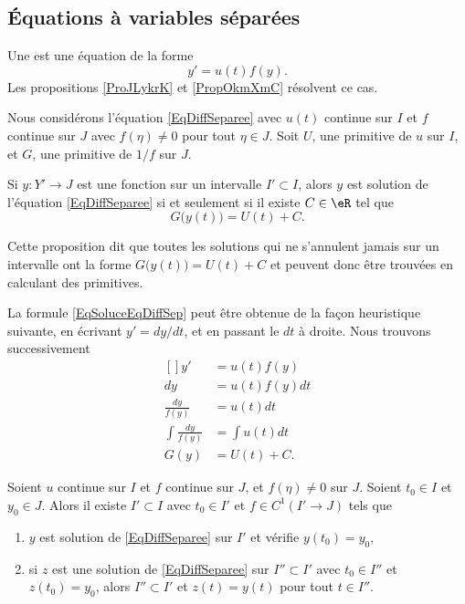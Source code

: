 					\subsection{Équations à variables séparées}

Une  est une équation  de la forme
\begin{equation}		\label{EqDiffSeparee}
	y'=u(t)f(y).
\end{equation}
Les propositions \ref{ProJLykrK} et \ref{PropOkmXmC} résolvent ce cas.
\begin{proposition}     \label{ProJLykrK}
Nous considérons l'équation \eqref{EqDiffSeparee} avec $u(t)$ continue sur $I$ et $f$ continue sur $J$ avec $f(\eta)\neq 0$ pour tout $\eta\in J$. Soit $U$, une primitive de $u$ sur $I$, et $G$, une primitive de $1/f$ sur $J$.

Si $y\colon Y'\to J$ est une fonction sur un intervalle $I'\subset I$, alors $y$ est solution de l'équation \eqref{EqDiffSeparee} si et seulement si il existe $C\in\eR$ tel que
\begin{equation}		\label{EqSoluceEqDiffSep}
	G\big( y(t) \big)=U(t)+C.
\end{equation}
\end{proposition}
Cette proposition dit que toutes les solutions qui ne s'annulent jamais sur un intervalle ont la forme $G\big( y(t) \big)=U(t)+C$ et peuvent donc être trouvées en calculant des primitives.

La formule \eqref{EqSoluceEqDiffSep} peut être obtenue de la façon heuristique suivante, en écrivant $y'=dy/dt$, et en passant le $dt$ à droite. Nous trouvons successivement
\begin{equation}
	\begin{aligned}[]
		y'&=u(t)f(y)\\
		dy&=u(t)f(y)dt\\
		\frac{ dy }{ f(y) }&=u(t)dt\\
		\int\frac{ dy }{ f(y) }&=\int u(t)dt\\
		G(y)&=U(t)+C.
	\end{aligned}
\end{equation}

\begin{proposition} \label{PropOkmXmC}
Soient $u$ continue sur $I$ et $f$ continue sur $J$, et $f(\eta)\neq 0$ sur $J$. Soient $t_0\in I$ et $y_0\in J$. Alors il existe $I'\subset I$ avec $t_0\in I'$ et $f\in C^1(I'\to J)$ tels que
\begin{enumerate}

\item
$y$ est solution de \eqref{EqDiffSeparee} sur $I'$ et vérifie $y(t_0)=y_0$,
\item
si $z$ est une solution de \eqref{EqDiffSeparee} sur $I''\subset I'$ avec $t_0\in I''$ et $z(t_0)=y_0$, alors $I''\subset I'$ et $z(t)=y(t)$ pour tout $t\in I''$.

\end{enumerate}
\end{proposition}


